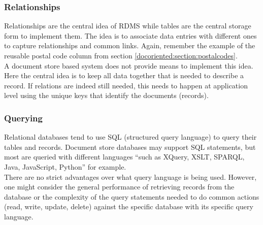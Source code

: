 \subsubsection{Relationships}
Relationships are the central idea of RDMS while tables are the central storage form to implement them. The idea is to associate data entries with different ones to capture relationships and common links. Again, remember the example of the reusable postal code column from section \ref{docoriented:section:postalcodes}.\\
A document store based system does not provide means to implement this idea. Here the central idea is to keep all data together that is needed to describe a record. If relations are indeed still needed, this needs to happen at application level \parencite{ian2016} using the unique keys that identify the documents (records).
\subsubsection{Querying}
Relational databases tend to use SQL (structured query language) to query their tables and records. Document store databases may support SQL statements, but most are queried with different languages “such as XQuery, XSLT, SPARQL, Java, JavaScript, Python” \parencite{ian2016} for example.\\
There are no strict advantages over what query language is being used. However, one might consider the general performance of retrieving records from the database or the complexity of the query statements needed to do common actions (read, write, update, delete) against the specific database with its specific query language.
